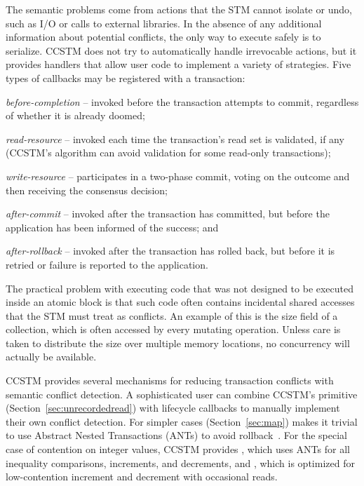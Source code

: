 The semantic problems come
from actions that the STM cannot isolate or undo, such as I/O or calls to
external libraries.  In the absence of any additional information about
potential conflicts, the only way to execute safely is to serialize.
CCSTM does not try to automatically handle irrevocable actions, but
it provides handlers that allow user code to implement a variety of
strategies.  Five types of callbacks may be registered with a transaction:
\begin{packed_itemize}

\item{\it before-completion} -- invoked before the transaction attempts to
commit, regardless of whether it is already doomed;

\item{\it read-resource} -- invoked each time the transaction's read
set is validated, if any (CCSTM's algorithm can avoid validation for
some read-only transactions);

\item{\it write-resource} -- participates in a two-phase commit, voting on the
outcome and then receiving the consensus decision;

\item{\it after-commit} -- invoked after the transaction has committed, but
before the application has been informed of the success; and

\item{\it after-rollback} -- invoked after the transaction has rolled back, but
before it is retried or failure is reported to the application.

\end{packed_itemize}

The practical problem with executing code that was not designed to
be executed inside an atomic block is that such code often contains
incidental shared accesses that the STM must treat as conflicts.
An example of this is the size field of a collection, which is often
accessed by every mutating operation.  Unless care is taken to distribute
the size over multiple memory locations, no concurrency will actually
be available.

CCSTM provides several mechanisms for reducing transaction conflicts with
semantic conflict detection.  A sophisticated user can combine CCSTM's
 primitive (Section~\ref{sec:unrecordedread}) with
lifecycle callbacks to manually implement their own conflict detection.
For simpler cases  (Section~\ref{sec:map})
makes it trivial to use Abstract Nested Transactions (ANTs) to avoid
rollback~\cite{harris07abstract}.  For the special case of contention
on integer values, CCSTM provides , which
uses ANTs for all inequality comparisons, increments, and decrements, and
, which is optimized for low-contention increment
and decrement with occasional reads.
